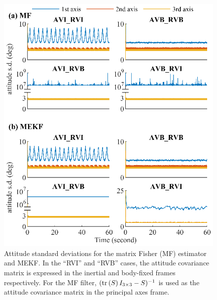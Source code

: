 \begin{figure}
	\centering
	\includegraphics[scale=1.4]{figures/observability/attitudeStd}
	\caption[Attitude standard deviations for the matrix Fisher (MF) estimator and MEKF.]{Attitude standard deviations for the matrix Fisher (MF) estimator and MEKF.
		In the ``RVI'' and ``RVB'' cases, the attitude covariance matrix is expressed in the inertial and body-fixed frames respectively.
		For the MF filter, $(\mathrm{tr}\left( S \right)I_{3\times 3}-S)^{-1}$ is used as the attitude covariance matrix in the principal axes frame. \label{fig:observability-attitudeStd}}
\end{figure}

